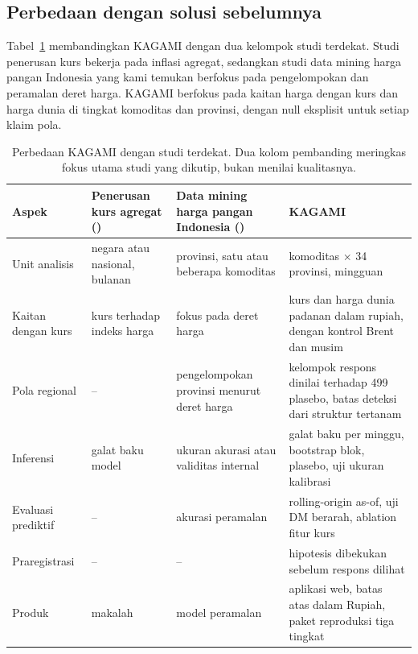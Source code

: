 \documentclass[11pt,a4paper]{article}
\makeatletter
\newcommand{\kg@one}[2]{\ifcsdef{#1@#2}{\csuse{#1@#2}}{\textbf{??#2}\PackageWarning{kagami}{Rujukan tak dikenal: #2}}}
\newcommand{\kg@item}[1]{\kg@sep\kg@one{refp}{#1}\def\kg@sep{; }}
\newcommand{\citep}[1]{\begingroup\def\kg@sep{}(\forcsvlist{\kg@item}{#1})\endgroup}
\makeatother
\begin{document}
\subsection{Perbedaan dengan solusi sebelumnya}

Tabel~\ref{tab:beda} membandingkan KAGAMI dengan dua kelompok studi terdekat. Studi penerusan kurs bekerja pada inflasi agregat,
sedangkan studi data mining harga pangan Indonesia yang kami temukan berfokus pada pengelompokan dan peramalan deret harga. KAGAMI berfokus pada kaitan
harga dengan kurs dan harga dunia di tingkat komoditas dan provinsi, dengan null eksplisit untuk setiap klaim pola.

\begin{table}[!htbp]
\centering\small
\caption{Perbedaan KAGAMI dengan studi terdekat. Dua kolom pembanding meringkas fokus utama studi yang dikutip, bukan menilai
kualitasnya.}
\label{tab:beda}
\begin{tabularx}{\textwidth}{@{}>{\RaggedRight}p{2.6cm} >{\RaggedRight}X >{\RaggedRight}X >{\RaggedRight}X@{}}
\toprule
Aspek & Penerusan kurs agregat \citep{suarsih2016,widarjono2023,unuvar2026} & Data mining harga pangan Indonesia \citep{rahkmawati2023,sumertajaya2024,amatullah2025,saputra2026} & KAGAMI \\
\midrule
Unit analisis & negara atau nasional, bulanan & provinsi, satu atau beberapa komoditas & 10 komoditas $\times$ 34 provinsi, mingguan \\
Kaitan dengan kurs & kurs terhadap indeks harga & fokus pada deret harga & kurs dan harga dunia padanan dalam rupiah, dengan kontrol Brent dan musim \\
Pola regional & -- & pengelompokan provinsi menurut deret harga & kelompok respons dinilai terhadap 499 plasebo, batas deteksi dari struktur tertanam \\
Inferensi & galat baku model & ukuran akurasi atau validitas internal & galat baku per minggu, bootstrap blok, plasebo, uji ukuran kalibrasi \\
Evaluasi prediktif & -- & akurasi peramalan & rolling-origin as-of, uji DM berarah, ablation fitur kurs \\
Praregistrasi & -- & -- & hipotesis dibekukan sebelum respons dilihat \\
Produk & makalah & model peramalan & aplikasi web, batas atas dalam Rupiah, paket reproduksi tiga tingkat \\
\bottomrule
\end{tabularx}
\end{table}
\end{document}
